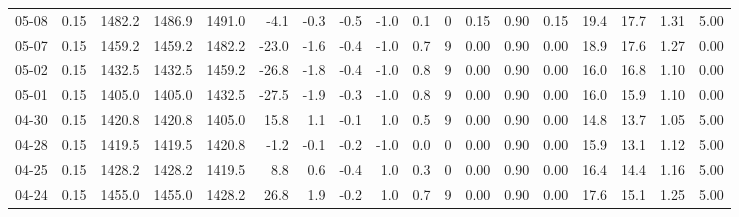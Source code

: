 \begin{threeparttable}
{\begin{tabular}{lrrrrrrrrrrrrrrrrr}
  05-08 &     0.15 & 1482.2 & 1486.9 & 1491.0 &       -4.1 &           -0.3 &                      -0.5 &                     -1.0 &                 0.1 &              0 &       0.15 &      0.90 &           0.15 &             19.4 &                17.7 &            1.31 &                   5.00 \\
  05-07 &     0.15 & 1459.2 & 1459.2 & 1482.2 &      -23.0 &           -1.6 &                      -0.4 &                     -1.0 &                 0.7 &              9 &       0.00 &      0.90 &           0.00 &             18.9 &                17.6 &            1.27 &                   0.00 \\
  05-02 &     0.15 & 1432.5 & 1432.5 & 1459.2 &      -26.8 &           -1.8 &                      -0.4 &                     -1.0 &                 0.8 &              9 &       0.00 &      0.90 &           0.00 &             16.0 &                16.8 &            1.10 &                   0.00 \\
  05-01 &     0.15 & 1405.0 & 1405.0 & 1432.5 &      -27.5 &           -1.9 &                      -0.3 &                     -1.0 &                 0.8 &              9 &       0.00 &      0.90 &           0.00 &             16.0 &                15.9 &            1.10 &                   0.00 \\
  04-30 &     0.15 & 1420.8 & 1420.8 & 1405.0 &       15.8 &            1.1 &                      -0.1 &                      1.0 &                 0.5 &              9 &       0.00 &      0.90 &           0.00 &             14.8 &                13.7 &            1.05 &                   5.00 \\
  04-28 &     0.15 & 1419.5 & 1419.5 & 1420.8 &       -1.2 &           -0.1 &                      -0.2 &                     -1.0 &                 0.0 &              0 &       0.00 &      0.90 &           0.00 &             15.9 &                13.1 &            1.12 &                   5.00 \\
  04-25 &     0.15 & 1428.2 & 1428.2 & 1419.5 &        8.8 &            0.6 &                      -0.4 &                      1.0 &                 0.3 &              0 &       0.00 &      0.90 &           0.00 &             16.4 &                14.4 &            1.16 &                   5.00 \\
  04-24 &     0.15 & 1455.0 & 1455.0 & 1428.2 &       26.8 &            1.9 &                      -0.2 &                      1.0 &                 0.7 &              9 &       0.00 &      0.90 &           0.00 &             17.6 &                15.1 &            1.25 &                   5.00 \\

\end{tabular}}
\end{threeparttable}
